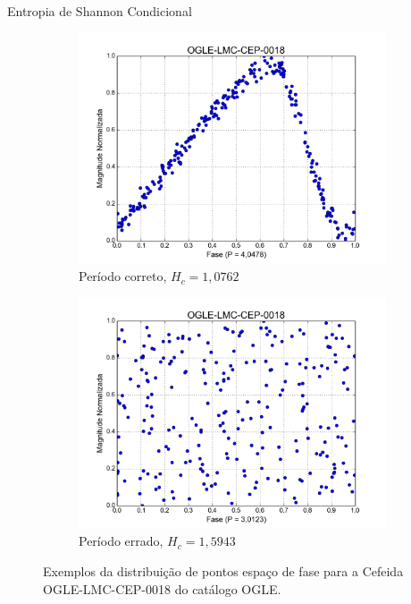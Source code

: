 \documentclass{beamer}
\begin{document}
\begin{frame}[allowframebreaks]{Entropia de Shannon Condicional}
\begin{figure}
\centering
\begin{subfigure}{.5\textwidth}
  \centering
  \includegraphics[width=\linewidth]{esp_fase_correto.png}
  \caption{Período correto, $H_c = 1,0762$}
  \label{fig:esp_fase_correto2}
\end{subfigure}%
\begin{subfigure}{.5\textwidth}
  \centering
  \includegraphics[width=\linewidth]{esp_fase_errado.png}
  \caption{Período errado, $H_c = 1,5943$}
  \label{fig:esp_fase_errado2}
\end{subfigure}
\caption[Exemplos de entropia]{Exemplos da distribuição de pontos espaço de fase para a Cefeida OGLE-LMC-CEP-0018 do catálogo OGLE.}
\label{fig:exemplo_entropia2}
\end{figure}

\end{frame}
\end{document}
